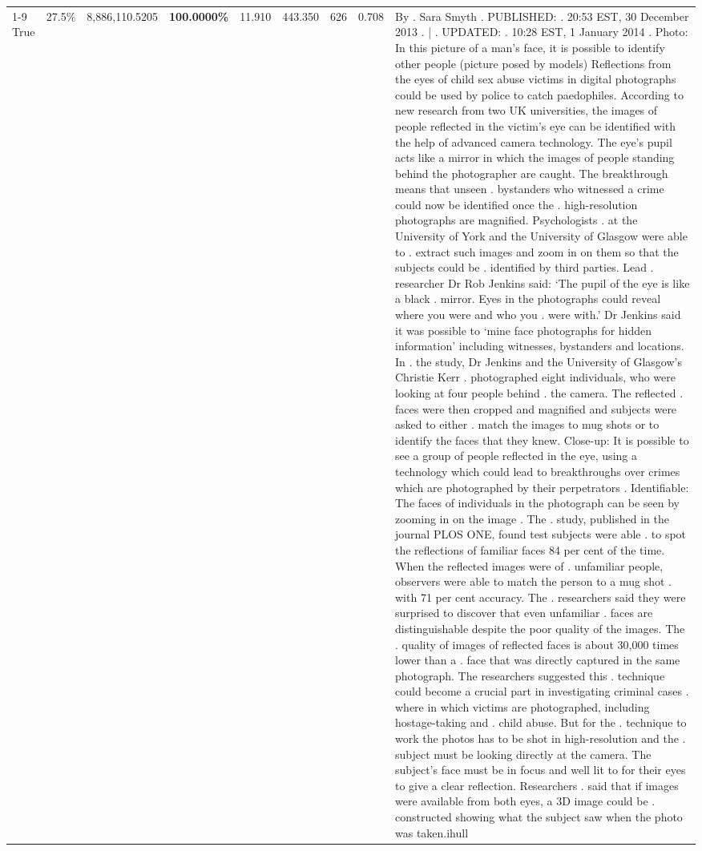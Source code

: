 \begin{table}[H]
\begin{tabular}{lllrlllll}
\cline{1-9}
True & 27.5\% & 8,886,110.5205 & \bfseries \color{red} 100.0000\% & 11.910 & 443.350 & 626 & 0.708 & By . Sara Smyth . PUBLISHED: . 20:53 EST, 30 December 2013 . | . UPDATED: . 10:28 EST, 1 January 2014 . Photo: In this picture of a man's face, it is possible to identify other people (picture posed by models) Reflections from the eyes of child sex abuse victims in digital photographs could be used by police to catch paedophiles. According to new research from two UK universities, the images of people reflected in the victim's eye can be identified with the help of advanced camera technology. The eye's pupil acts like a mirror in which the images of people standing behind the photographer are caught. The breakthrough means that unseen . bystanders who witnessed a crime could now be identified once the . high-resolution photographs are magnified. Psychologists . at the University of York and the University of Glasgow were able to . extract such images and zoom in on them so that the subjects could be . identified by third parties. Lead . researcher Dr Rob Jenkins said: ‘The pupil of the eye is like a black . mirror. Eyes in the photographs could reveal where you were and who you . were with.' Dr Jenkins said it was possible to ‘mine face photographs for hidden information' including witnesses, bystanders and locations. In . the study, Dr Jenkins and the University of Glasgow's Christie Kerr . photographed eight individuals, who were looking at four people behind . the camera. The reflected . faces were then cropped and magnified and subjects were asked to either . match the images to mug shots or to identify the faces that they knew. Close-up: It is possible to see a group of people reflected in the eye, using a technology which could lead to breakthroughs over crimes which are photographed by their perpetrators . Identifiable: The faces of individuals in the photograph can be seen by zooming in on the image . The . study, published in the journal PLOS ONE, found test subjects were able . to spot the reflections of familiar faces 84 per cent of the time. When the reflected images were of . unfamiliar people, observers were able to match the person to a mug shot . with 71 per cent accuracy. The . researchers said they were surprised to discover that even unfamiliar . faces are distinguishable despite the poor quality of the images. The . quality of images of reflected faces is about 30,000 times lower than a . face that was directly captured in the same photograph. The researchers suggested this . technique could become a crucial part in investigating criminal cases . where in which victims are photographed, including hostage-taking and . child abuse. But for the . technique to work the photos has to be shot in high-resolution and the . subject must be looking directly at the camera. The subject's face must be in focus and well lit to for their eyes to give a clear reflection. Researchers . said that if images were available from both eyes, a 3D image could be . constructed showing what the subject saw when the photo was taken.ihull \\

\end{tabular}
\end{table}
